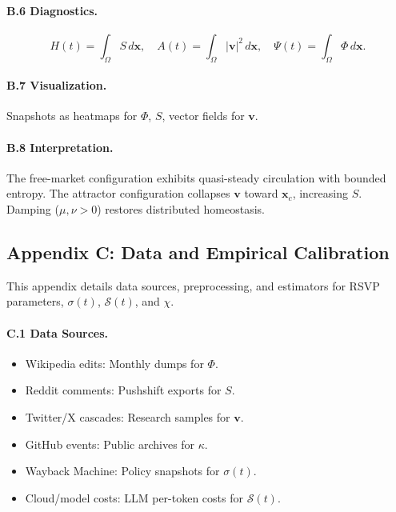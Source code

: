 \documentclass[12pt]{article}
\begin{document}
\paragraph{B.6 Diagnostics.}

\[
H(t) = \int_{\Omega} S \, d\mathbf{x}, \quad A(t) = \int_{\Omega} |\mathbf{v}|^2 \, d\mathbf{x}, \quad \Psi(t) = \int_{\Omega} \Phi \, d\mathbf{x}.
\]

\paragraph{B.7 Visualization.}

Snapshots as heatmaps for \(\Phi\), \(S\), vector fields for \(\mathbf{v}\).

\paragraph{B.8 Interpretation.}

The free-market configuration exhibits quasi-steady circulation with bounded entropy. The attractor configuration collapses \(\mathbf{v}\) toward \(\mathbf{x}_c\), increasing \(S\). Damping (\(\mu, \nu > 0\)) restores distributed homeostasis.

\subsection*{Appendix C: Data and Empirical Calibration}

This appendix details data sources, preprocessing, and estimators for RSVP parameters, \(\sigma(t)\), \(\mathcal{S}(t)\), and \(\chi\).

\paragraph{C.1 Data Sources.}

\begin{itemize}
  \item Wikipedia edits: Monthly dumps for \(\Phi\).
  \item Reddit comments: Pushshift exports for \(S\).
  \item Twitter/X cascades: Research samples for \(\mathbf{v}\).
  \item GitHub events: Public archives for \(\kappa\).
  \item Wayback Machine: Policy snapshots for \(\sigma(t)\).
  \item Cloud/model costs: LLM per-token costs for \(\mathcal{S}(t)\).
\end{itemize}
\end{document}
